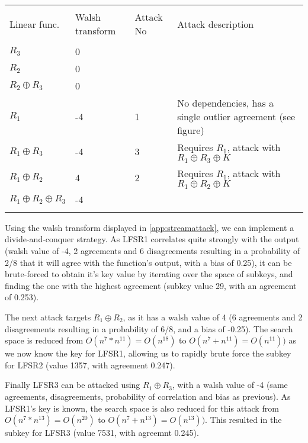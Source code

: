 \documentclass[british,11pt,a4paper]{article}
\begin{document}
\begin{center}
\begin{tabular}{@{}llll@{}}\label{tab:streamattack} \\
  \toprule \\
  Linear func. & Walsh transform & Attack No & Attack description \\
  \midrule \\
  \(R_3\) & 0 \\
  \(R_2\) & 0 & & \\
  \(R_2 \oplus R_3\) & 0 & & \\
  \(R_1\) & -4 & 1 & No dependencies, has a single outlier agreement (see figure)\\
  \(R_1 \oplus R_3\) & -4 & 3 & Requires \(R_1\), attack with \(R_1 \oplus R_3 \oplus K\)\\
  \(R_1 \oplus R_2\) & 4 & 2 & Requires \(R_1\), attack with \(R_1 \oplus R_2 \oplus K\)\\
  \(R_1 \oplus R_2 \oplus R_3\) & -4 & & \\

  \bottomrule \\
\end{tabular}
\end{center}
Using the walsh transform displayed in \autoref{app:streamattack}, we can implement a divide-and-conquer strategy.
As LFSR1 correlates quite strongly with the output (walsh value of -4, 2 agreements and 6 disagreements resulting in a probability of 2/8 that it will agree with the function's output, with a bias of 0.25),
it can be brute-forced to obtain it's key value by iterating over the space of subkeys, and finding the one with the highest agreement (subkey value 29, with an agreement of 0.253).

The next attack targets \(R_1 \oplus R_2\), as it has a walsh value of 4 (6 agreements and 2 disagreements resulting in a probability of 6/8, and a bias of -0.25).
The search space is reduced from \(O(n^{7} * n^{11})=O(n^{18})\) to \(O(n^7 + n^{11})=O(n^{11}))\) as we now know the key for LFSR1, allowing us to rapidly brute force the subkey for LFSR2 (value 1357, with agreement 0.247).

Finally LFSR3 can be attacked using \(R_1 \oplus R_3\), with a walsh value of -4 (same agreements, disagreements, probability of correlation and bias as previous).
As LFSR1's key is known, the search space is also reduced for this attack from \(O(n^{7} * n^{13})=O(n^{20})\) to \(O(n^7 + n^{13})=O(n^{13}))\). This resulted in the subkey for LFSR3 (value 7531, with agreemnt 0.245).
\end{document}

